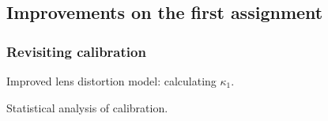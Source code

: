 
\subsection{Improvements on the first assignment}
\label{sec:improvements}

\subsubsection{Revisiting calibration}

Improved lens distortion model: calculating $\kappa_{1}$.

Statistical analysis of calibration.

